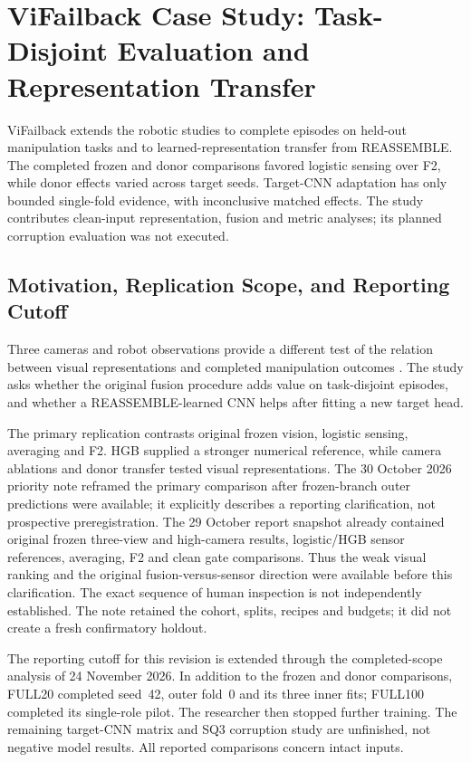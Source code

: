 \chapter{ViFailback Case Study: Task-Disjoint Evaluation and Representation Transfer}
\label{ch:vifailback}

ViFailback extends the robotic studies to complete episodes on held-out manipulation
tasks and to learned-representation transfer from REASSEMBLE. The completed frozen and
donor comparisons favored logistic sensing over F2, while donor effects varied across
target seeds. Target-CNN adaptation has only bounded single-fold evidence, with
inconclusive matched effects. The study contributes clean-input representation, fusion
and metric analyses; its planned corruption evaluation was not executed.

\section{Motivation, Replication Scope, and Reporting Cutoff}
Three cameras and robot observations provide a different test of the relation between
visual representations and completed manipulation outcomes \citep{Zeng2026ViFailback}.
The study asks whether the original fusion procedure adds value on task-disjoint
episodes, and whether a REASSEMBLE-learned CNN helps after fitting a new target head.

The primary replication contrasts original frozen vision, logistic sensing, averaging
and F2. HGB supplied a stronger numerical reference, while camera ablations and donor
transfer tested visual representations. The 30 October 2026 priority note reframed the primary comparison after frozen-branch
outer predictions were available; it explicitly describes a reporting clarification,
not prospective preregistration. The 29 October report snapshot already contained
original frozen three-view and high-camera results, logistic/HGB sensor references,
averaging, F2 and clean gate comparisons. Thus the weak visual ranking and the original
fusion-versus-sensor direction were available before this clarification. The exact
sequence of human inspection is not independently established. The note retained the
cohort, splits, recipes and budgets; it did not create a fresh confirmatory holdout.

The reporting cutoff for this revision is extended through the completed-scope analysis
of 24 November 2026. In addition to the frozen and donor comparisons, FULL20 completed
seed~42, outer fold~0 and its three inner fits; FULL100 completed its single-role pilot.
The researcher then stopped further training. The remaining target-CNN matrix and SQ3
corruption study are unfinished, not negative model results. All reported comparisons
concern intact inputs.

